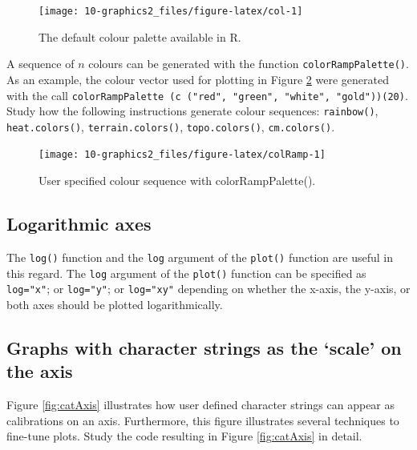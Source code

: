 \documentclass[
]{book}
\begin{document}
\begin{figure}
\texttt{[image: 10-graphics2\_files/figure-latex/col-1]} \caption{The default colour palette available in R.}\label{fig:col}
\end{figure}

A sequence of \(n\) colours can be generated with the function \texttt{colorRampPalette()}. As an example, the colour vector used for plotting in Figure \ref{fig:colRamp} were generated with the call \texttt{colorRampPalette\ (c\ ("red",\ "green",\ "white",\ "gold"))(20)}. Study how the following instructions generate colour sequences: \texttt{rainbow()}, \texttt{heat.colors()}, \texttt{terrain.colors()}, \texttt{topo.colors()}, \texttt{cm.colors()}.

\begin{figure}
\texttt{[image: 10-graphics2\_files/figure-latex/colRamp-1]} \caption{User specified colour sequence with colorRampPalette().}\label{fig:colRamp}
\end{figure}

\subsection{Logarithmic axes}\label{logarithmic-axes}

The \texttt{log()} function and the \texttt{log} argument of the \texttt{plot()} function are useful in this regard. The \texttt{log} argument of the \texttt{plot()} function can be specified as \texttt{log="x"}; or \texttt{log="y"}; or \texttt{log="xy"} depending on whether the x-axis, the y-axis, or both axes should be plotted logarithmically.

\subsection{Graphs with character strings as the `scale' on the axis}\label{graphs-with-character-strings-as-the-scale-on-the-axis}

Figure \ref{fig:catAxis} illustrates how user defined character strings can appear as calibrations on an axis. Furthermore, this figure illustrates several techniques to fine-tune plots. Study the code resulting in Figure \ref{fig:catAxis} in detail.
\end{document}
